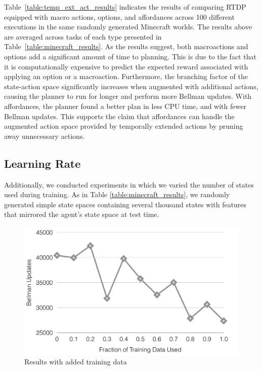 \documentclass[letterpaper]{article}
\begin{document}
Table~\ref{table:temp_ext_act_results} indicates the results of comparing RTDP
equipped with macro actions, options, and affordances across 100 different executions
in the same randomly generated Minecraft worlds. The results above are averaged across tasks of
each type presented in Table~\ref{table:minecraft_results}. As the results 
suggest, both macroactions and options add a significant amount of time to planning.
This is due to the fact that it is computationally expensive to predict the expected reward
associated with applying an option or a macroaction. Furthermore, the branching factor of the
state-action space significantly increases when augmented with additional actions, causing the
planner to run for longer and perform more Bellman updates. With affordances, the planner found a better plan
in less CPU time, and with fewer Bellman updates. This supports the claim that affordances can handle the augmented 
action space provided by temporally extended actions by pruning away unnecessary actions.

\subsection{Learning Rate}
Additionally, we conducted experiments in which we varied the number of states used during training. 
As in Table \ref{table:minecraft_results}, we randomly generated simple state spaces
containing several thousand states with features that mirrored the agent's state
space at test time.

\begin{figure}[H]
\centering
\includegraphics[scale=0.23]{figures/training_results.png}%
  \caption{Results with added training data}
  \label{fig:training_results}
\end{figure}
\end{document}
